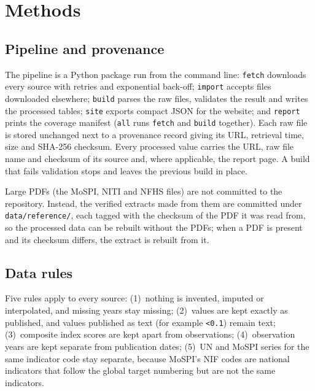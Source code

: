 \documentclass[11pt,a4paper]{article}
\newcommand{\code}[1]{\texttt{\small #1}}
\begin{document}
\section{Methods}\label{sec:methods}

\subsection{Pipeline and provenance}
The pipeline is a Python package run from the command line: \code{fetch} downloads every source with retries and exponential back-off; \code{import} accepts files downloaded elsewhere; \code{build} parses the raw files, validates the result and writes the processed tables; \code{site} exports compact JSON for the website; and \code{report} prints the coverage manifest (\code{all} runs \code{fetch} and \code{build} together). Each raw file is stored unchanged next to a provenance record giving its URL, retrieval time, size and SHA-256 checksum. Every processed value carries the URL, raw file name and checksum of its source and, where applicable, the report page. A build that fails validation stops and leaves the previous build in place.

Large PDFs (the MoSPI, NITI and NFHS files) are not committed to the repository. Instead, the verified extracts made from them are committed under \code{data/reference/}, each tagged with the checksum of the PDF it was read from, so the processed data can be rebuilt without the PDFs; when a PDF is present and its checksum differs, the extract is rebuilt from it.

\subsection{Data rules}
Five rules apply to every source:
(1)~nothing is invented, imputed or interpolated, and missing years stay missing;
(2)~values are kept exactly as published, and values published as text (for example \code{<0.1}) remain text;
(3)~composite index scores are kept apart from observations;
(4)~observation years are kept separate from publication dates;
(5)~UN and MoSPI series for the same indicator code stay separate, because MoSPI's NIF codes are national indicators that follow the global target numbering but are not the same indicators.
\end{document}
